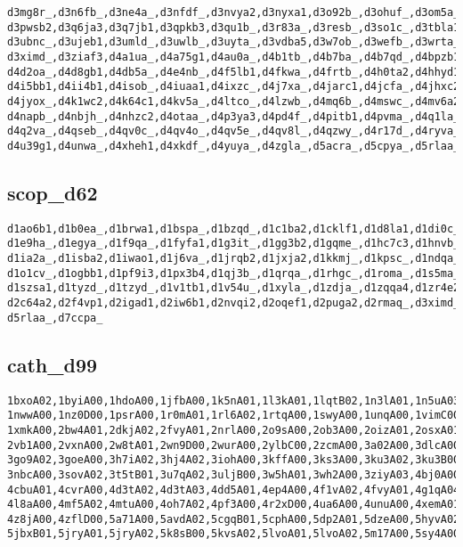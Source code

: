\documentclass[letter]{article}
\begin{document}
\begin{verbatim}
d3mg8r_,d3n6fb_,d3ne4a_,d3nfdf_,d3nvya2,d3nyxa1,d3o92b_,d3ohuf_,d3om5a_,d3ozqa1,
d3pwsb2,d3q6ja3,d3q7jb1,d3qpkb3,d3qu1b_,d3r83a_,d3resb_,d3so1c_,d3tbla1,d3tcrb_,
d3ubnc_,d3ujeb1,d3umld_,d3uwlb_,d3uyta_,d3vdba5,d3w7ob_,d3wefb_,d3wrta_,d3wyla_,
d3ximd_,d3ziaf3,d4a1ua_,d4a75g1,d4au0a_,d4b1tb_,d4b7ba_,d4b7qd_,d4bpzb1,d4cqli_,
d4d2oa_,d4d8gb1,d4db5a_,d4e4nb_,d4f5lb1,d4fkwa_,d4frtb_,d4h0ta2,d4hhyd1,d4hx6a1,
d4i5bb1,d4ii4b1,d4isob_,d4iuaa1,d4ixzc_,d4j7xa_,d4jarc1,d4jcfa_,d4jhxc2,d4jyka2,
d4jyox_,d4k1wc2,d4k64c1,d4kv5a_,d4ltco_,d4lzwb_,d4mq6b_,d4mswc_,d4mv6a2,d4mw5b1,
d4napb_,d4nbjh_,d4nhzc2,d4otaa_,d4p3ya3,d4pd4f_,d4pitb1,d4pvma_,d4q1la_,d4q1sy_,
d4q2va_,d4qseb_,d4qv0c_,d4qv4o_,d4qv5e_,d4qv8l_,d4qzwy_,d4r17d_,d4ryva_,d4tvab4,
d4u39g1,d4unwa_,d4xheh1,d4xkdf_,d4yuya_,d4zgla_,d5acra_,d5cpya_,d5rlaa_,d7ccpa_
\end{verbatim}

\subsection{scop\_d62}

\begin{verbatim}
d1ao6b1,d1b0ea_,d1brwa1,d1bspa_,d1bzqd_,d1c1ba2,d1cklf1,d1d8la1,d1di0c_,d1dm5c_,
d1e9ha_,d1egya_,d1f9qa_,d1fyfa1,d1g3it_,d1gg3b2,d1gqme_,d1hc7c3,d1hnvb_,d1i6hf_,
d1ia2a_,d1isba2,d1iwao1,d1j6va_,d1jrqb2,d1jxja2,d1kkmj_,d1kpsc_,d1ndqa_,d1nzwb_,
d1o1cv_,d1ogbb1,d1pf9i3,d1px3b4,d1qj3b_,d1qrqa_,d1rhgc_,d1roma_,d1s5ma_,d1srgb_,
d1szsa1,d1tyzd_,d1tzyd_,d1v1tb1,d1v54u_,d1xyla_,d1zdja_,d1zqqa4,d1zr4e2,d220la_,
d2c64a2,d2f4vp1,d2igad1,d2iw6b1,d2nvqi2,d2oqef1,d2puga2,d2rmaq_,d3ximd_,d4otaa_,
d5rlaa_,d7ccpa_
\end{verbatim}

\subsection{cath\_d99}

\begin{verbatim}
1bxoA02,1byiA00,1hdoA00,1jfbA00,1k5nA01,1l3kA01,1lqtB02,1n3lA01,1n5uA03,1nkiA00,
1nwwA00,1nz0D00,1psrA00,1r0mA01,1rl6A02,1rtqA00,1swyA00,1unqA00,1vimC00,1wmwB00,
1xmkA00,2bw4A01,2dkjA02,2fvyA01,2nrlA00,2o9sA00,2ob3A00,2oizA01,2osxA01,2rbkA01,
2vb1A00,2vxnA00,2w8tA01,2wn9D00,2wurA00,2ylbC00,2zcmA00,3a02A00,3dlcA00,3e2oA01,
3go9A02,3goeA00,3h7iA02,3hj4A02,3iohA00,3kffA00,3ks3A00,3ku3A02,3ku3B00,3lqbA00,
3nbcA00,3sovA02,3t5tB01,3u7qA02,3uljB00,3w5hA01,3wh2A00,3ziyA03,4bj0A00,4cayB00,
4cbuA01,4cvrA00,4d3tA02,4d3tA03,4dd5A01,4ep4A00,4f1vA02,4fvyA01,4g1qA04,4k8gA02,
4l8aA00,4mf5A02,4mtuA00,4oh7A02,4pf3A00,4r2xD00,4ua6A00,4unuA00,4xemA01,4yapA01,
4z8jA00,4zflD00,5a71A00,5avdA02,5cgqB01,5cphA00,5dp2A01,5dzeA00,5hyvA02,5ibnA00,
5jbxB01,5jryA01,5jryA02,5k8sB00,5kvsA02,5lvoA01,5lvoA02,5m17A00,5sy4A00
\end{verbatim}
\end{document}
